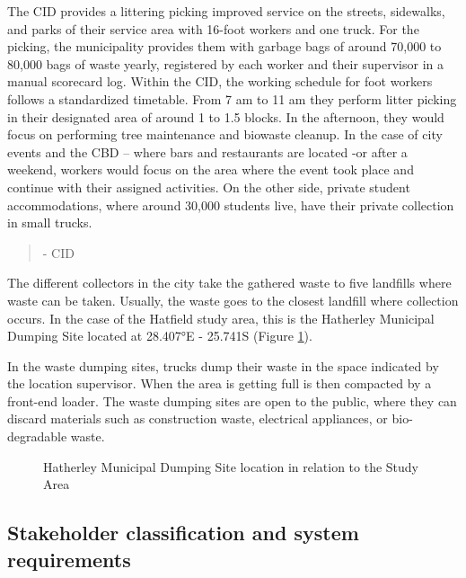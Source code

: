 \documentclass[authoryear,preprint,review,12pt]{elsarticle}
\begin{document}
    The CID provides a littering picking improved service on the streets, sidewalks, and parks of their service area with 16-foot workers and one truck. For the picking, the municipality provides them with garbage bags of around 70,000 to 80,000 bags of waste yearly, registered by each worker and their supervisor in a manual scorecard log.
    Within the CID, the working schedule for foot workers follows a standardized timetable. From 7 am to 11 am they perform litter picking in their designated area of around 1 to 1.5 blocks. In the afternoon, they would focus on performing tree maintenance and biowaste cleanup. In the case of city events and the CBD – where bars and restaurants are located -or after a weekend, workers would focus on the area where the event took place and continue with their assigned activities. On the other side, private student accommodations, where around 30,000 students live, have their private collection in small trucks.

    \begin{quotation}
        - CID
    \end{quotation} 

    The different collectors in the city take the gathered waste to five landfills where waste can be taken. Usually, the waste goes to the closest landfill where collection occurs. In the case of the Hatfield study area, this is the Hatherley Municipal Dumping Site located at 28.407°E - 25.741S (Figure \ref{fig:landfill}).

    In the waste dumping sites, trucks dump their waste in the space indicated by the location supervisor. When the area is getting full is then compacted by a front-end loader. The waste dumping sites are open to the public, where they can discard materials such as construction waste, electrical appliances, or bio-degradable waste.

    \begin{figure}[h]
        \caption{Hatherley Municipal Dumping Site location in relation to the Study Area}
        \label{fig:landfill}
    \end{figure}

    \subsection{Stakeholder classification and system requirements} \label{subsec:Classification}
\end{document}
